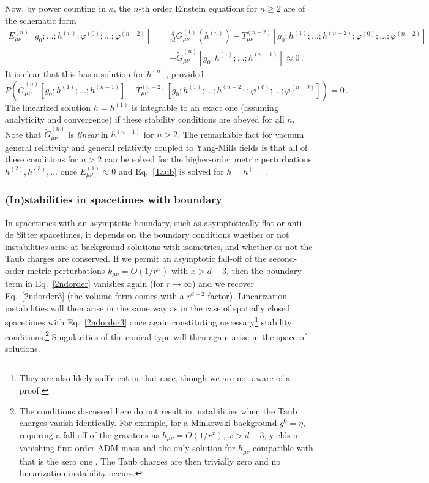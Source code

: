 \documentclass[]{jkpaper}
\theoremstyle{plain}
\theoremstyle{definition}
\begin{document}
Now, by power counting in $\kappa$, the $n$-th order Einstein equations for $n\ge2$ are of the schematic form
\begin{align}
    E^{(n)}_{\mu \nu}[g_0;\ldots;h^{(n)}; \varphi^{(0)};\ldots;\varphi^{(n-2)}] =&\frac{4}{n!}G^{(1)}_{\mu \nu}(h^{(n)})-T_{\mu \nu}^{(n-2)}[g_0;h^{(1)};\ldots; h^{(n-2)};\varphi^{(0)};\ldots;\varphi^{(n-2)}]\nonumber\\
&+\tilde{G}_{\mu \nu}^{(n)}[g_0;h^{(1)};\ldots;h^{(n-1)}]\approx0\,.\nonumber
\end{align}
It is clear that this has a solution for $h^{(n)}$, provided
\begin{equation}
    P\left(\tilde{G}_{\mu \nu}^{(n)}[g_0;h^{(1)};\ldots;h^{(n-1)}]-T_{\mu \nu}^{(n-2)}[g_0;h^{(1)};\ldots; h^{(n-2)};\varphi^{(0)};\ldots;\varphi^{(n-2)}]\right)=0\,.
\end{equation}
The linearized solution $h=h^{(1)}$ is integrable to an exact one (assuming analyticity and convergence) if these stability conditions are obeyed for all $n$. Note that $\tilde{G}^{(n)}_{\mu \nu}$ is \emph{linear} in $h^{(n-1)}$ for $n>2$. The remarkable fact for vacuum general relativity and general relativity coupled to Yang-Mills fields is that all of these conditions for $n>2$ can be solved for the higher-order metric perturbations $h^{(2)},h^{(3)},\ldots$ once $E^{(1)}_{\mu \nu}\approx0$ and Eq.~\eqref{Taub} is solved for $h=h^{(1)}$ \cite{fischer1980structure,Arms:1982ea,Marsden_lectures}.






\subsubsection{(In)stabilities in spacetimes with boundary}

In spacetimes with an asymptotic boundary, such as asymptotically flat or anti-de Sitter spacetimes, it depends on the boundary conditions whether or not instabilities arise at background solutions with isometries, and whether or not the Taub charges are conserved. If we permit an asymptotic fall-off of the second-order metric perturbations $k_{\mu \nu}=O(1/r^x)$ with $x>d-3$, then the boundary term in Eq.~\eqref{2ndorder} vanishes again (for $r\to\infty$) and we recover Eq.~\eqref{2ndorder3} (the volume form comes with a $r^{d-2}$ factor). Linearization instabilities will then arise in the same way as in the case of spatially closed spacetimes with Eq.~\eqref{2ndorder3} once again constituting necessary\footnote{They are also likely sufficient in that case, though we are not aware of a proof.} stability conditions.\footnote{The conditions discussed here do not result in instabilities when the Taub charges vanish identically. For example, for a Minkowski background $g^0=\eta$, requiring a fall-off of the gravitons as $h_{\mu \nu}=O(1/r^x)$, $x>d-3$, yields a vanishing first-order ADM mass and the only solution for $h_{\mu \nu}$ compatible with that is the zero one \cite{Brill:1968ca,Deser:1968zzf}. The Taub charges are then trivially zero and no linearization instability occurs.} Singularities of the conical type will then again arise in the space of solutions. 
\end{document}
